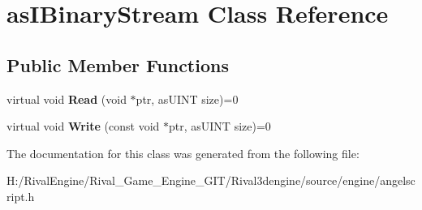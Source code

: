\hypertarget{classas_i_binary_stream}{}\section{as\+I\+Binary\+Stream Class Reference}
\label{classas_i_binary_stream}
\subsection*{Public Member Functions}
\begin{DoxyCompactItemize}
\item 
\mbox{\label{classas_i_binary_stream_ab69b772db0a4157a842d90070e6fa1dc}} 
virtual void {\bfseries Read} (void $\ast$ptr, as\+U\+I\+NT size)=0
\item 
\mbox{\label{classas_i_binary_stream_a1fce5bbea004d6b2705f9eefae1a3770}} 
virtual void {\bfseries Write} (const void $\ast$ptr, as\+U\+I\+NT size)=0
\end{DoxyCompactItemize}


The documentation for this class was generated from the following file\+:\begin{DoxyCompactItemize}
\item 
H\+:/\+Rival\+Engine/\+Rival\+\_\+\+Game\+\_\+\+Engine\+\_\+\+G\+I\+T/\+Rival3dengine/source/engine/angelscript.\+h\end{DoxyCompactItemize}
